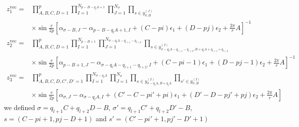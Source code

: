 \documentclass[main.tex]{subfiles}
\begin{document}
\begin{subappendices}
\begin{equation}
\begin{aligned}
z^{\text{vec}}_1=&\prod_{A,B,C,D=1}^p\prod_{I=1}^{N_{p-B-q_lA+1}}\prod_{J=1}^{N_{\sigma}}\prod_{s\in y_{\sigma,B}^{(J)}}\\
&\times\sin\frac{r}{2p}\left[\alpha_{\sigma-B,J}-\alpha_{p-B-q_lA+1,I}+(C-pi)\epsilon_1+(D-pj)\epsilon_2+\frac{2\pi}{r}A\right]^{-1}
\end{aligned}
\end{equation}
\begin{equation}
\begin{aligned}
z^{\text{vec}}_2=&\prod_{A,B,C,D=1}^p\prod_{I=1}^{N_{p-B+1}}\prod_{J=1}^{N_{\sigma-q_lA-q_{l+1}-q_{l+2}}}\prod_{s\in y_{\sigma-q_lA-q_{l+1}-q_{l+2},B+q_lA+q_{l+1}+q_{l+2}}^{(I)}}\\
&\times\sin\frac{r}{2p}\left[\alpha_{p-B+1,J}-\alpha_{\sigma-q_lA-q_{l+1}-q_{l+2},I}+(C-pi-1)\epsilon_1+(D-pj-1)\epsilon_2+\frac{2\pi}{r}A\right]^{-1}
\end{aligned}
\end{equation}
\begin{equation}
\begin{aligned}
z^{\text{vec}}_3=&\prod_{A,B,C,D,C',D'=1}^p\prod_{I=1}^{N_{\sigma-q_lA}}\prod_{J=1}^{N_{\sigma}}\prod_{s\in y_{\sigma-q_lA,B+q_lA}^{(I)}}\prod_{s'\in y_{\sigma,B}^{(I)}}\\
&\times\sin\frac{r}{2p}\left[\alpha_{\sigma,J}-\alpha_{\sigma-q_lA,I}+(C'-C-pi'+pi)\epsilon_1+(D'-D-pj'+pj)\epsilon_2+\frac{2\pi}{r}A\right]
\end{aligned}
\end{equation}
we defined $\sigma=q_{l+1}C+q_{l+2}D-B$, $\sigma'=q_{l+1}C'+q_{l+2}D'-B$, $s=(C-pi+1,pj-D+1)$ and $s'=(C'-pi'+1,pj'-D'+1)$
\end{subappendices}
\end{document}
